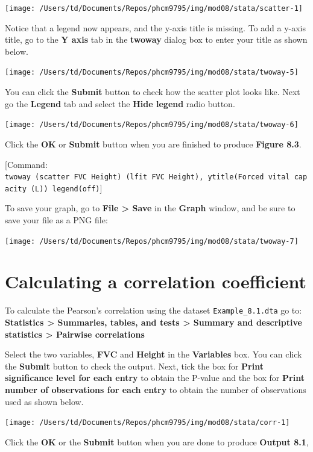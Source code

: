 \documentclass[
]{memoir}
\begin{document}
\texttt{[image: /Users/td/Documents/Repos/phcm9795/img/mod08/stata/scatter-1]}

Notice that a legend now appears, and the y-axis title is missing. To add a y-axis title, go to the \textbf{Y axis} tab in the \textbf{twoway} dialog box to enter your title as shown below.

\texttt{[image: /Users/td/Documents/Repos/phcm9795/img/mod08/stata/twoway-5]}

You can click the \textbf{Submit} button to check how the scatter plot looks like. Next go the \textbf{Legend} tab and select the \textbf{Hide legend} radio button.

\texttt{[image: /Users/td/Documents/Repos/phcm9795/img/mod08/stata/twoway-6]}

Click the \textbf{OK} or \textbf{Submit} button when you are finished to produce \textbf{Figure 8.3}.

{[}Command: \texttt{twoway\ (scatter\ FVC\ Height)\ (lfit\ FVC\ Height),\ ytitle(Forced\ vital\ capacity\ (L))\ legend(off)}{]}

To save your graph, go to \textbf{File \textgreater{} Save} in the \textbf{Graph} window, and be sure to save your file as a PNG file:

\texttt{[image: /Users/td/Documents/Repos/phcm9795/img/mod08/stata/twoway-7]}

\hypertarget{calculating-a-correlation-coefficient}{%
\section{Calculating a correlation coefficient}\label{calculating-a-correlation-coefficient}}

To calculate the Pearson's correlation using the dataset \texttt{Example\_8.1.dta} go to: \textbf{Statistics \textgreater{} Summaries, tables, and tests \textgreater{} Summary and descriptive statistics \textgreater{} Pairwise correlations}

Select the two variables, \textbf{FVC} and \textbf{Height} in the \textbf{Variables} box. You can click the \textbf{Submit} button to check the output. Next, tick the box for \textbf{Print significance level for each entry} to obtain the P-value and the box for \textbf{Print number of observations for each entry} to obtain the number of observations used as shown below.

\texttt{[image: /Users/td/Documents/Repos/phcm9795/img/mod08/stata/corr-1]}

Click the \textbf{OK} or the \textbf{Submit} button when you are done to produce \textbf{Output 8.1},
\end{document}
